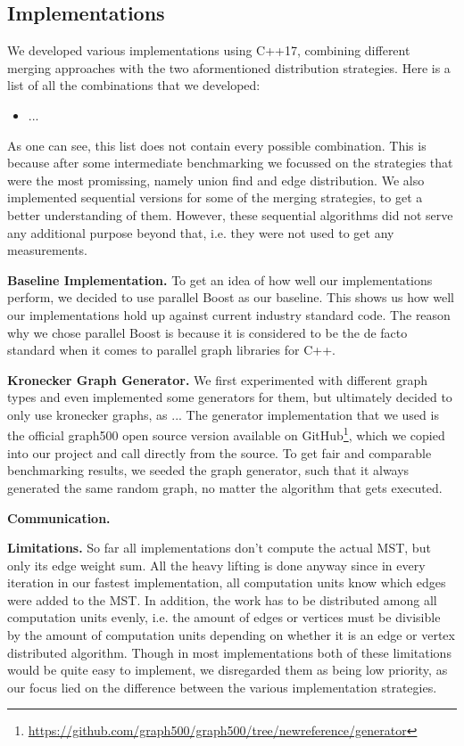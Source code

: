 \documentclass[letterpaper]{article}
\newcommand{\mypar}[1]{{\bf #1.}}
\begin{document}
\subsection{Implementations}
We developed various implementations using C++17, combining different merging approaches with the two aformentioned
distribution strategies. Here is a list of all the combinations that we developed:
\begin{itemize}
  \item ... %
\end{itemize}
As one can see, this list does not contain every possible combination. This is because after some intermediate
benchmarking we focussed on the strategies that were the most promissing, namely union find and edge distribution.
We also implemented sequential versions for some of the merging strategies, to get a better understanding of them.
However, these sequential algorithms did not serve any additional purpose beyond that, i.e. they were not used to get
any measurements.

\mypar{Baseline Implementation}
To get an idea of how well our implementations perform, we decided to use parallel Boost as our baseline. This shows us
how well our implementations hold up against current industry standard code. The reason why we chose parallel Boost is
because it is considered to be the de facto standard when it comes to parallel graph libraries for C++.

\mypar{Kronecker Graph Generator}
We first experimented with different graph types and even implemented some generators for them, but ultimately decided
to only use kronecker graphs, as ... %
The generator implementation that we used is the official graph500 open source version available on
GitHub\footnote{\url{https://github.com/graph500/graph500/tree/newreference/generator}}, which we copied into our
project and call directly from the source. To get fair and comparable benchmarking results, we seeded the graph
generator, such that it always generated the same random graph, no matter the algorithm that gets executed.

\mypar{Communication}

\mypar{Limitations}
So far all implementations don't compute the actual MST, but only its edge weight sum. All the heavy lifting is done anyway since in every iteration in our fastest implementation, all computation units know which edges were added to the MST. In addition, the work has to be distributed among all computation units evenly, i.e. the amount of edges or vertices must be divisible by the amount of
computation units depending on whether it is an edge or vertex distributed algorithm. Though in most implementations
both of these limitations would be quite easy to implement, we disregarded them as being low priority, as our focus lied
on the difference between the various implementation strategies.
\end{document}
